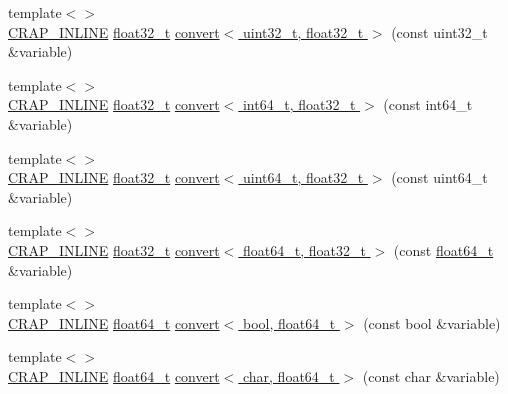 \begin{DoxyCompactItemize}
{\footnotesize template$<$$>$ }\\\hyperlink{config__x86_8h_a5a40526b8d842e7ff731509998bb0f1c}{C\+R\+A\+P\+\_\+\+I\+N\+L\+I\+N\+E} \hyperlink{crap__types_8h_a4611b605e45ab401f02cab15c5e38715}{float32\+\_\+t} \hyperlink{namespacecrap_a62dcdb36919875237e8a1cd3a137bf5a}{convert$<$ uint32\+\_\+t, float32\+\_\+t $>$} (const uint32\+\_\+t \&variable)
\item 
{\footnotesize template$<$$>$ }\\\hyperlink{config__x86_8h_a5a40526b8d842e7ff731509998bb0f1c}{C\+R\+A\+P\+\_\+\+I\+N\+L\+I\+N\+E} \hyperlink{crap__types_8h_a4611b605e45ab401f02cab15c5e38715}{float32\+\_\+t} \hyperlink{namespacecrap_a89d61e7168b4eb377351449a330f4fc3}{convert$<$ int64\+\_\+t, float32\+\_\+t $>$} (const int64\+\_\+t \&variable)
\item 
{\footnotesize template$<$$>$ }\\\hyperlink{config__x86_8h_a5a40526b8d842e7ff731509998bb0f1c}{C\+R\+A\+P\+\_\+\+I\+N\+L\+I\+N\+E} \hyperlink{crap__types_8h_a4611b605e45ab401f02cab15c5e38715}{float32\+\_\+t} \hyperlink{namespacecrap_a99c9d071b9f52a5ec23cc06825cfd011}{convert$<$ uint64\+\_\+t, float32\+\_\+t $>$} (const uint64\+\_\+t \&variable)
\item 
{\footnotesize template$<$$>$ }\\\hyperlink{config__x86_8h_a5a40526b8d842e7ff731509998bb0f1c}{C\+R\+A\+P\+\_\+\+I\+N\+L\+I\+N\+E} \hyperlink{crap__types_8h_a4611b605e45ab401f02cab15c5e38715}{float32\+\_\+t} \hyperlink{namespacecrap_aaf3c16d6739ac5fc4759053ea3f1cff8}{convert$<$ float64\+\_\+t, float32\+\_\+t $>$} (const \hyperlink{crap__types_8h_ac55f3ae81b5bc9053760baacf57e47f4}{float64\+\_\+t} \&variable)
\item 
{\footnotesize template$<$$>$ }\\\hyperlink{config__x86_8h_a5a40526b8d842e7ff731509998bb0f1c}{C\+R\+A\+P\+\_\+\+I\+N\+L\+I\+N\+E} \hyperlink{crap__types_8h_ac55f3ae81b5bc9053760baacf57e47f4}{float64\+\_\+t} \hyperlink{namespacecrap_afbb4cead12dd3392415830ee6cb2e083}{convert$<$ bool, float64\+\_\+t $>$} (const bool \&variable)
\item 
{\footnotesize template$<$$>$ }\\\hyperlink{config__x86_8h_a5a40526b8d842e7ff731509998bb0f1c}{C\+R\+A\+P\+\_\+\+I\+N\+L\+I\+N\+E} \hyperlink{crap__types_8h_ac55f3ae81b5bc9053760baacf57e47f4}{float64\+\_\+t} \hyperlink{namespacecrap_ae0246250ddc72c1835153f97999602e4}{convert$<$ char, float64\+\_\+t $>$} (const char \&variable)
\item 

\end{DoxyCompactItemize}
